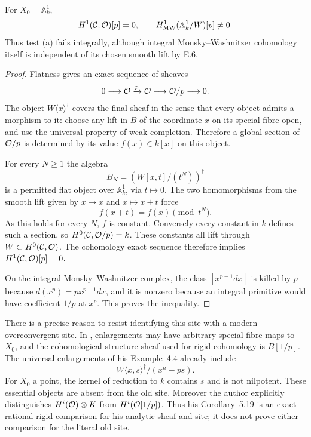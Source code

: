 \begin{proposition}\label{prop:DE-old-site}
For $X_0=\mathbb A^1_k$,
\[
 H^1(\mathcal C,\mathcal O)[p]=0,
 \qquad
 H^1_{\rm MW}(\mathbb A^1_k/W)[p]\ne0.
\]
Thus test (a) fails integrally, although integral Monsky--Washnitzer cohomology itself is independent of its chosen smooth lift by E.6.
\end{proposition}
\begin{proof}
Flatness gives an exact sequence of sheaves
\[
          0\longrightarrow\mathcal O\xrightarrow p\mathcal O
                    \longrightarrow\mathcal O/p\longrightarrow0.
\]
The object $W\langle x\rangle^\dagger$ covers the final sheaf in the sense that every object admits a morphism to it: choose any lift in $B$ of the coordinate $x$ on its special-fibre open, and use the universal property of weak completion.  Therefore a global section of $\mathcal O/p$ is determined by its value $f(x)\in k[x]$ on this object.

For every $N\geq1$ the algebra
\[
                    B_N=(W[x,t]/(t^N))^\dagger
\]
is a permitted flat object over $\mathbb A^1_k$, via $t\mapsto0$.  The two homomorphisms from the smooth lift given by $x\mapsto x$ and $x\mapsto x+t$ force
\[
                      f(x+t)=f(x)\pmod {t^N}.
\]
As this holds for every $N$, $f$ is constant.  Conversely every constant in $k$ defines such a section, so $H^0(\mathcal C,\mathcal O/p)=k$.  These constants all lift through $W\subset H^0(\mathcal C,\mathcal O)$.  The cohomology exact sequence therefore implies $H^1(\mathcal C,\mathcal O)[p]=0$.

On the integral Monsky--Washnitzer complex, the class $[x^{p-1}dx]$ is killed by $p$ because $d(x^p)=p x^{p-1}dx$, and it is nonzero because an integral primitive would have coefficient $1/p$ at $x^p$.  This proves the inequality.
\end{proof}

There is a precise reason to resist identifying this site with a modern overconvergent site.  In \cite[Definitions~3.1, 3.7; Example~3.8(ii)]{Zhang2019}, enlargements may have arbitrary special-fibre maps to $X_0$, and the cohomological structure sheaf used for rigid cohomology is $B[1/p]$.  The universal enlargements of his Example~4.4 already include
\[
       W\langle x,s\rangle^\dagger/(x^n-ps).
\]
For $X_0$ a point, the kernel of reduction to $k$ contains $s$ and is not nilpotent.  These essential objects are absent from the old site.  Moreover the author explicitly distinguishes $H^i(\mathcal O)\otimes K$ from $H^i(\mathcal O[1/p])$.  Thus his Corollary~5.19 is an exact rational rigid comparison for his analytic sheaf and site; it does not prove either comparison for the literal old site.

